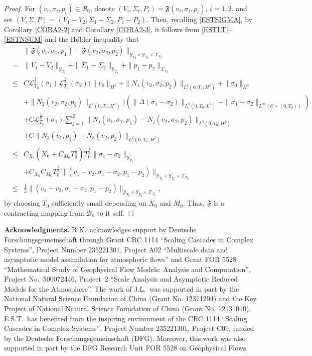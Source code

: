 \documentclass[12pt,reqno]{amsart}
\numberwithin{equation}{section}
\begin{document}
\begin{proof}
For $(v_i,\sigma_i,p_i)\in\mathscr B_0$, denote $(V_i,\Sigma_i,P_i)=\mathfrak F(v_i,\sigma_i,p_i)$, $i=1,2$, and set   $(V,\Sigma,P)=(V_1-V_2,\Sigma_1-\Sigma_2,P_1-P_2)$. Then,
recalling \eqref{ESTSIGMA}, by Corollary \ref{CORA2-2} and Corollary \ref{CORA2-3}, it follows from \eqref{ESTLT}--\eqref{ESTNSUM} and the H\"older inequality that
\begin{eqnarray*}
  &&\|\mathfrak F(v_1,\sigma_1,p_1)-\mathfrak F(v_2,\sigma_2,p_2)\|_{\mathscr Y_{T_0}\times\mathscr Y_{T_0}\times\mathscr X_{T_0}}\\
  &=&\|V_1-V_2\|_{\mathscr Y_{T_0}}+\|\Sigma_1-\Sigma_2\|_{\mathscr Y_{T_0}}+\|p_1-p_2\|_{\mathscr X_{T_0}}\\
  &\leq&C\mathcal L_{T_0}^\frac12(\sigma_1)\mathcal L_{T_0}^\frac12(\sigma_2)(\|v_0\|_{H^3}+\|N_1(v_2,\sigma_2,p_2)\|_{L^2(0,T_0;H^2)}
  +\|\sigma_0\|_{H^3}\\
  &&+\|N_2(v_2,\sigma_2,p_2)\|_{L^2(0,T_0;H^2)})
  (\|\Delta(\sigma_1-\sigma_2)\|_{L^2(0,T_0;L^2)}+\|\sigma_1-\sigma_2\|_{L^\infty(\mathcal O\times(0,T_0))})\\
  &&+C\mathcal L_{T_0}^\frac12(\sigma_1)\sum_{j=1}^2\|N_j(v_1,\sigma_1,p_1)-N_j(v_2,\sigma_2,p_2)\|_{L^2(0,T_0;H^2)}\\
  &&+C\|N_3(v_1,p_1)-N_3(v_2,p_2)\|_{L^2(0,T_0; H^2)}\\
  &\leq&C_{X_0}(X_0+C_{M_0}T_0^\frac12)T_0^\frac12\|\sigma_1-\sigma_2\|_{\mathscr Y_{T_0}}\\
  &&+C_{X_0}C_{M_0}T_0^\frac12\|(v_1-v_2,\sigma_1-\sigma_2,p_1-p_2)\|_{\mathscr Y_{T_0}\times\mathscr Y_{T_0}\times
     \mathscr X_{T_0}}\\
  &\leq&\frac12\|(v_1-v_2,\sigma_1-\sigma_2,p_1-p_2)\|_{\mathscr Y_{T_0}\times\mathscr Y_{T_0}\times
     \mathscr X_{T_0}},
\end{eqnarray*}
by choosing $T_0$ sufficiently small depending on $X_0$ and $M_0$. Thus, $\mathfrak F$ is a contracting mapping from $\mathscr B_0$ to it self.
\end{proof}

\smallskip
{\bf Acknowledgments.}
R.K.~acknowledges support by Deutsche Forschungsgemeinschaft through Grant CRC 1114 ``Scaling Cascades in Complex Systems'', Project Number 235221301, Project A02 ``Multiscale data and asymptotic model assimilation for atmospheric flows'' and Grant FOR 5528 ``Mathematical Study of Geophysical Flow Models: Analysis and Computation'', Project No.~500072446, Project~2 ``Scale Analysis and Asymptotic Reduced Models for the Atmosphere''.
The work of J.L.~was supported in part by the National Natural Science Foundation of China (Grant No. 12371204) and the Key Project of National Natural Science Foundation of China (Grant No. 12131010). E.S.T.~has benefited from the inspiring environment of the CRC 1114 ``Scaling Cascades in Complex Systems'', Project Number 235221301, Project C09, funded by the Deutsche Forschungsgemeinschaft (DFG). Moreover, this work was also supported in part by the DFG Research Unit FOR 5528 on Geophysical Flows.
\end{document}

